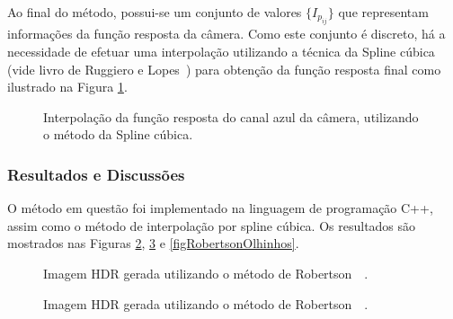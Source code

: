 Ao final do método, possui-se um conjunto de valores $\{I_{p_{ij}}\}$ que representam informações da função resposta da câmera. Como este conjunto é discreto, há a necessidade de efetuar uma interpolação utilizando a técnica da Spline cúbica (vide livro de Ruggiero e Lopes~\cite{livroCalculoNumerico}) para obtenção da função resposta final como ilustrado na Figura \ref{figRobertsonPontos}. 

\begin{figure}[H]
  \centering
  \quad %
  \caption{Interpolação da função resposta do canal azul da câmera, utilizando o método da Spline cúbica.}
  \label{figRobertsonPontos}
\end{figure}

\subsubsection{Resultados e Discussões} \label{metodoRobertsonResultado}

O método em questão foi implementado na linguagem de programação C++, assim como o método de interpolação por spline cúbica. Os resultados são mostrados nas Figuras \ref{figRobertsonDidatica}, \ref{figRobertsonPorquinho} e \ref{figRobertsonOlhinhos}.

\begin{figure}[H]
  \centering
  \quad %
  \caption{Imagem HDR gerada utilizando o método de Robertson~\etal~\protect\cite{robertson}.}
  \label{figRobertsonDidatica}
\end{figure}

\begin{figure}[H]
  \centering
  \quad %
  \quad %
  \caption{Imagem HDR gerada utilizando o método de Robertson~\etal~\protect\cite{robertson}.}
  \label{figRobertsonPorquinho}
\end{figure}


